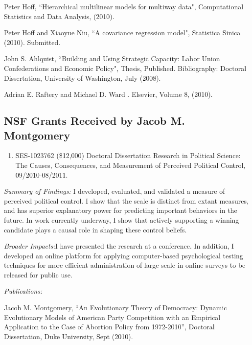 \documentclass[pdftex,12pt,fullpage,oneside]{amsart}
\begin{document}
\begin{list}{}{\leftmargin=1em}
\item Peter Hoff, ``Hierarchical multilinear models for multiway
  data", {\sc Computational Statistics and Data Analysis}, (2010).

\item Peter Hoff and Xiaoyue Niu, ``A covariance regression model",
  Statistica Sinica (2010). Submitted.


\item  John S. Ahlquist, ``Building and Using Strategic Capacity: Labor Union Confederations and Economic Policy", Thesis, Published.
Bibliography: Doctoral Dissertation, University of Washington, July (2008).

\item  Adrian E. Raftery and Michael D. Ward
.
\newblock Elsevier, Volume 8, (2010).


\end{list}

 \subsection{NSF Grants Received by Jacob M. Montgomery}
\begin{enumerate}
\item SES-1023762  (\$12,000) Doctoral Dissertation Research in Political Science: The Causes, Consequences, and Measurement of Perceived Political Control, 09/2010-08/2011.    
\end{enumerate}

\textit{Summary of Findings:} I developed, evaluated, and validated a
measure of perceived political control. I show that the scale is
distinct from extant measures, and has superior explanatory power for
predicting important behaviors in the future. In work currently
underway, I show that actively supporting a winning candidate plays a
causal role in shaping these control beliefs.

\textit{Broader Impacts:}I have presented the research at a
conference.  In addition, I developed an online platform for applying
computer-based psychological testing techniques for more efficient
administration of large scale in online surveys to be released for
public use.

\textit{Publications:}

\begin{list}{}{\leftmargin=1em} \small
\item Jacob M. Montgomery, ``An Evolutionary Theory of Democracy:
  Dynamic Evolutionary Models of American Party Competition with an
  Empirical Application to the Case of Abortion Policy from
  1972-2010'', Doctoral Dissertation, Duke University, Sept (2010).
\end{list}
\end{document}
